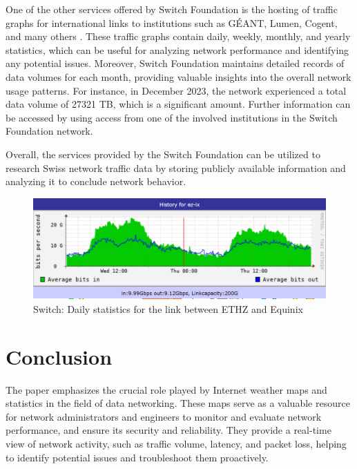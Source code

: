 \documentclass[sigconf,authorversion,nonacm]{acmart}
\begin{document}
One of the other services offered by Switch Foundation is the hosting of traffic graphs for international links to institutions such as GÉANT, Lumen, Cogent, and many others \cite{switchgraph}. These traffic graphs contain daily, weekly, monthly, and yearly statistics, which can be useful for analyzing network performance and identifying any potential issues. Moreover, Switch Foundation maintains detailed records of data volumes for each month, providing valuable insights into the overall network usage patterns. For instance, in December 2023, the network experienced a total data volume of 27321 TB, which is a significant amount. Further information can be accessed by using access from one of the involved institutions in the Switch Foundation network.

Overall, the services provided by the Switch Foundation can be utilized to research Swiss network traffic data by storing publicly available information and analyzing it to conclude network behavior.

\begin{figure}
    \centering
    \includegraphics[width=\linewidth]{SWITCH/stats ez-ix.PNG}
    \caption{Switch: Daily statistics for the link between ETHZ and Equinix}
    \label{SWITCH: Daily statistics between ETHZ and Equinix}
\end{figure}

\section{Conclusion}

The paper emphasizes the crucial role played by Internet weather maps and statistics in the field of data networking. These maps serve as a valuable resource for network administrators and engineers to monitor and evaluate network performance, and ensure its security and reliability. They provide a real-time view of network activity, such as traffic volume, latency, and packet loss, helping to identify potential issues and troubleshoot them proactively. 
\end{document}
